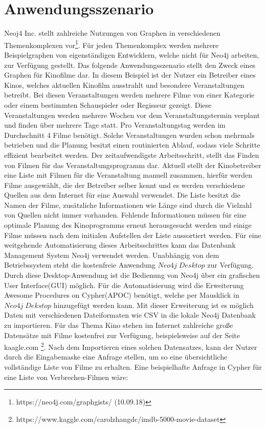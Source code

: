 \section{Anwendungsszenario}
Neoj4 Inc. stellt zahlreiche Nutzungen von Graphen in verschiedenen Themenkomplexen vor\footnote{https://neo4j.com/graphgists/ (10.09.18)}. Für jeden Themenkomplex werden mehrere Beispielgraphen von eigenständigen Entwicklern, welche nicht für Neo4j arbeiten, zur Verfügung gestellt. Das folgende Anwendungsszenario stellt den Zweck eines Graphen für Kinofilme dar.\newline
In diesem Beispiel ist der Nutzer ein Betreiber eines Kinos, welches aktuellen Kinofilm ausstrahlt und besondere Veranstaltungen betreibt. Bei diesen Veranstaltungen werden mehrere Filme von einer Kategorie oder einem bestimmten Schauspieler oder Regisseur gezeigt. Diese Veranstaltungen werden mehrere Wochen vor dem Veranstaltungstermin verplant und finden über mehrere Tage statt. Pro Veranstaltungstag werden im Durchschnitt 4 Filme benötigt. Solche Veranstaltungen wurden schon mehrmals betrieben und die Planung besitzt einen routinierten Ablauf, sodass viele Schritte effizient bearbeitet werden. Der zeitaufwendigste Arbeitsschritt, stellt das Finden von Filmen für das Veranstaltungsprogramm dar. \newline
Aktuell stellt der Kinobetreiber eine Liste mit Filmen für die Veranstaltung manuell zusammen, hierfür werden Filme ausgewählt, die der Betreiber selber kennt und es werden verschiedene Quellen aus dem Internet für eine Auswahl verwendet. Die Liste besitzt die Namen der Filme, zusätzliche Informationen wie Länge sind durch die Vielzahl von Quellen nicht immer vorhanden. Fehlende Informationen müssen für eine optimale Planung des Kinoprogramms erneut herausgesucht werden und einige Filme müssen nach dem initialen Aufstellen der Liste  aussortiert werden. \newline  
Für eine weitgehende Automatisierung dieses Arbeitsschrittes kann das Datenbank Management System Neo4j verwendet werden. Unabhängig von dem Betriebssystem steht die kostenfreie Anwendung $Neo4j\; Desktop$ zur Verfügung. Durch diese Desktop-Anwendung ist die Bedienung von Neo4j über ein grafischen User Interface(GUI) möglich. Für die Automatisierung wird die Erweiterung Awesome  Procedures on Cypher(APOC) benötigt, welche per Mausklick in $Neo4j\; Dekstop$ hinzugefügt werden kann. Mit dieser Erweiterung ist es möglich Daten mit verschiedenen Dateiformaten wie CSV in die lokale Neo4j Datenbank zu importieren. Für das Thema Kino stehen im Internet zahlreiche große Datensätze mit Filme kostenfrei zur Verfügung, beispielsweise auf der Seite kaagle.com \footnote{https://www.kaggle.com/carolzhangdc/imdb-5000-movie-dataset}. Nach dem Importieren eines solchen Datensatzes, kann der Nutzer durch die Eingabemaske eine Anfrage stellen, um so eine übersichtliche vollständige Liste von Filme zu erhalten. Eine beispielhafte Anfrage in Cypher für eine Liste von Verbrechen-Filmen wäre: 
